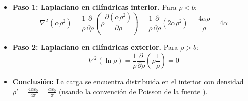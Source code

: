 \documentclass[a4paper]{article}
\begin{document}
\begin{itemize}
    \item \textbf{Paso 1: Laplaciano en cilíndricas interior.} Para $\rho < b$:
    \begin{equation*}
        \nabla^2 (\alpha \rho^2) = \frac{1}{\rho} \frac{\partial}{\partial \rho} \left( \rho \frac{\partial(\alpha \rho^2)}{\partial \rho} \right) = \frac{1}{\rho} \frac{\partial}{\partial \rho} (2\alpha \rho^2) = \frac{4\alpha \rho}{\rho} = 4\alpha
    \end{equation*}
    \item \textbf{Paso 2: Laplaciano en cilíndricas exterior.} Para $\rho > b$:
    \begin{equation*}
        \nabla^2 (\ln \rho) = \frac{1}{\rho} \frac{\partial}{\partial \rho} \left( \rho \frac{1}{\rho} \right) = 0
    \end{equation*}
    \item \textbf{Conclusión:} La carga se encuentra distribuida en el interior con densidad $\rho' = \frac{4\alpha \epsilon_0}{4\pi} = \frac{\alpha \epsilon_0}{\pi}$ (usando la convención de Poisson de la fuente \cite{103, 104}).
\end{itemize}




 
\end{document}
